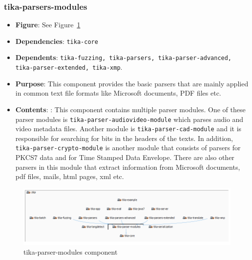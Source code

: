 \documentclass{article}
\begin{document}
\subsubsection{tika-parsers-modules}
\begin {itemize}
\item \textbf{Figure}: See Figure~\ref{fig:tika-parser-modules}
\item \textbf{Dependencies}: \texttt{tika-core}
\item \textbf{Dependents}: \texttt{tika-fuzzing, tika-parsers, tika-parser-advanced, \\tika-parser-extended, tika-xmp}.
\item \textbf{Purpose}: This component provides the basic parsers that are mainly applied in common text file formats like Microsoft documents, PDF files etc. 
\item \textbf{Contents}: : This component contains multiple parser modules. One of these parser modules is \texttt{tika-parser-audiovideo-module} which parses audio and video metadata files. Another module is \texttt{tika-parser-cad-module} and it is responsible for searching for bits in the headers of the texts. In addition, \texttt{tika-parser-crypto-module} is another module that consists of parsers for PKCS7 data and for Time Stamped Data Envelope. There are also other parsers in this module that extract information from Microsoft documents, pdf files, mails, html pages, xml etc. 
\end{itemize}
\begin{figure}[ht]
    \centering
    \includegraphics[width=1\textwidth]{report/images/tikamodules.PNG}
    \caption{tika-parser-modules component}
    \label{fig:tika-parser-modules}
\end{figure}
\end{document}
